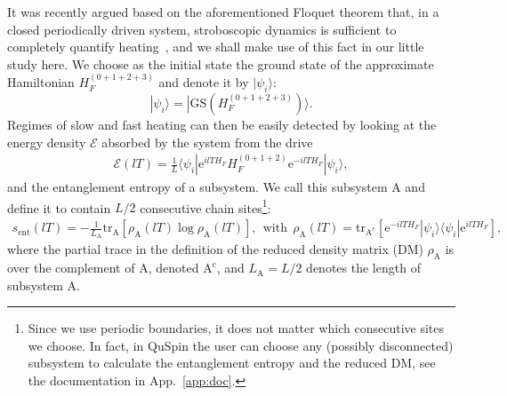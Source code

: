\documentclass{SciPost}
\newcommand\0{\scalebox{-1}[1]{0}}
\begin{document}
It was recently argued based on the aforementioned Floquet theorem that, in a closed periodically driven system, stroboscopic dynamics is sufficient to completely quantify heating~\cite{bukov_16}, and we shall make use of this fact in our little study here. We choose as the initial state the ground state of the approximate Hamiltonian $H_F^{(0+1+2+3)}$ and denote it by $|\psi_i\rangle$:
\begin{equation}
|\psi_i\rangle = |\mathrm{GS}(H_F^{(0+1+2+3)})\rangle.
\end{equation}
Regimes of slow and fast heating can then be easily detected by looking at the energy density $\mathcal{E}$ absorbed by the system from the drive
\begin{eqnarray}
\mathcal{E}(lT) = \frac{1}{L}\langle\psi_i|\mathrm e^{ilT H_F}H_F^{(0+1+2)}\mathrm e^{-ilT H_F}|\psi_i\rangle, 
\label{eq:Floquet_E}
\end{eqnarray}
and the entanglement entropy of a subsystem. We call this subsystem A and define it to contain $L/2$ consecutive chain sites\footnote{Since we use periodic boundaries, it does not matter which consecutive sites we choose. In fact, in QuSpin the user can choose any (possibly disconnected) subsystem to calculate the entanglement entropy and the reduced DM, see the documentation in App.~\ref{app:doc}.}:
\begin{eqnarray}
s_\mathrm{ent}(lT) = -\frac{1}{L_\mathrm{A}}\mathrm{tr}_\mathrm{A}\left[ \rho_\mathrm{A}(lT)\log\rho_\mathrm{A}(lT) \right], \ \ \mathrm{with}\ \ \rho_\mathrm{A}(lT) = \mathrm{tr}_\mathrm{A^c}\left[ \mathrm e^{-ilT H_F}|\psi_i\rangle\langle\psi_i|\mathrm e^{ilT H_F}\right],
\label{eq:Floquet_S}
\end{eqnarray}
where the partial trace in the definition of the reduced density matrix (DM) $\rho_\mathrm{A}$ is over the complement of A, denoted $\mathrm{A^c}$, and $L_\mathrm{A}=L/2$ denotes the length of subsystem A.
\end{document}
